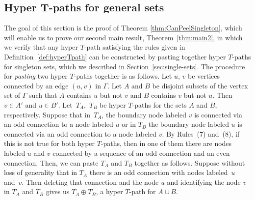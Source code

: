 \documentclass[pdftex]{sigma}
\numberwithin{equation}{section}
\begin{document}
\subsection[Hyper T-paths for general sets]{Hyper $\boldsymbol{T}$-paths for general sets}\label{sec:gen-sets}
The goal of this section is the proof of Theorem \ref{thm:CanPeelSingleton}, which will enable us to prove our second main result, Theorem~\ref{thm:main2}, in which we verify that any hyper $T$-path satisfying the rules given in Definition~\ref{def:hyperTpath} can be constructed by pasting together hyper $T$-paths for singleton sets, which we described in Section~\ref{sec:single-sets}.
The procedure for \emph{pasting} two hyper $T$-paths together is as follows. Let $u$, $v$ be vertices connected by an edge $(u,v)$ in $\Gamma$. Let $A$ and $B$ be disjoint subsets of the vertex set of $\Gamma$ such that $A$ contains $u$ but not $v$ and $B$ contains $v$ but not $u$. Then $v \in A'$ and $u \in B'$. Let~$T_A$,~$T_B$ be hyper $T$-paths for the sets $A$ and $B$, respectively. Suppose that in~$T_A$, the boundary node labeled $v$ is connected via an odd connection to a node labeled $u$ or in $T_B$ the boundary node labeled $u$ is connected via an odd connection to a node labeled $v$. By Rules~(7) and~(8), if this is not true for both hyper $T$-paths, then in one of them there are nodes labeled $u$ and $v$ connected by a sequence of an odd connection and an even connection. Then, we can paste $T_A$ and $T_B$ together as follows. Suppose without loss of generality that in $T_A$ there is an odd connection with nodes labeled~$u$ and~$v$. Then deleting that connection and the node $u$ and identifying the node $v$ in $T_A$ and $T_B$ gives us $T_A\oplus T_B$, a hyper $T$-path for $A \cup B$.
\end{document}
